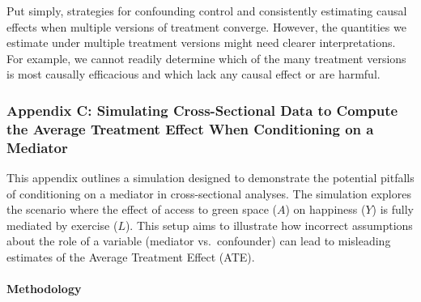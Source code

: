 \documentclass[
  singlecolumn]{article}
\let\oldparagraph\paragraph
\renewcommand{\paragraph}[1]{\oldparagraph{#1}\mbox{}}
\begin{document}
Put simply, strategies for confounding control and consistently
estimating causal effects when multiple versions of treatment converge.
However, the quantities we estimate under multiple treatment versions
might need clearer interpretations. For example, we cannot readily
determine which of the many treatment versions is most causally
efficacious and which lack any causal effect or are harmful.

\newpage{}

\subsubsection{Appendix C: Simulating Cross-Sectional Data to Compute
the Average Treatment Effect When Conditioning on a
Mediator}\label{appendix-c}

This appendix outlines a simulation designed to demonstrate the
potential pitfalls of conditioning on a mediator in cross-sectional
analyses. The simulation explores the scenario where the effect of
access to green space (\(A\)) on happiness (\(Y\)) is fully mediated by
exercise (\(L\)). This setup aims to illustrate how incorrect
assumptions about the role of a variable (mediator vs.~confounder) can
lead to misleading estimates of the Average Treatment Effect (ATE).

\paragraph{Methodology}\label{methodology}
\end{document}
